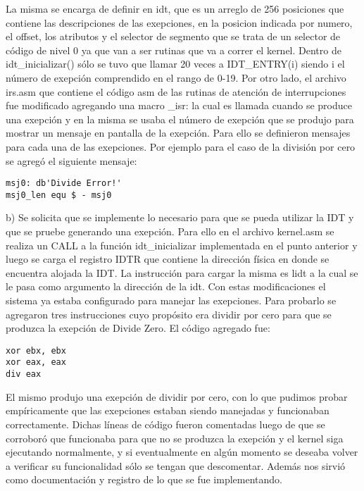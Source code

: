 \documentclass[a4paper]{article}
\begin{document}
La misma se encarga de definir en idt, que es un arreglo de 256 posiciones que contiene las descripciones de las exepciones, en la posicion indicada por numero, el offset, los atributos y el selector de segmento que se trata de un selector de código de nivel 0 ya que van a ser rutinas que va a correr el kernel. Dentro de idt_inicializar() sólo se tuvo que llamar 20 veces a IDT_ENTRY(i) siendo i el número de exepción comprendido en el rango de 0-19.
Por otro lado, el archivo irs.asm que contiene el código asm de las rutinas de atención de interrupciones fue modificado agregando una macro _isr: la cual es llamada cuando se produce una exepción y en la misma se usaba el número de exepción que se produjo para mostrar un mensaje en pantalla de la exepción. Para ello se definieron mensajes para cada una de las exepciones. Por ejemplo para el caso de la división por cero se agregó el siguiente mensaje:

\begin{verbatim}
msj0: db'Divide Error!'
msj0_len equ $ - msj0
\end{verbatim}

b) Se solicita que se implemente lo necesario para que se pueda utilizar la IDT y que se pruebe generando una exepción. Para ello en el archivo kernel.asm se realiza un CALL a la función idt_inicializar implementada en el punto anterior y luego se carga el registro IDTR que contiene la dirección física en donde se encuentra alojada la IDT. La instrucción para cargar la misma es lidt a la cual se le pasa como argumento la dirección de la idt. Con estas modificaciones el sistema ya estaba configurado para manejar las exepciones. Para probarlo se agregaron tres instrucciones cuyo propósito era dividir por cero para que se produzca la exepción de Divide Zero. El código agregado fue:

\begin{verbatim}
xor ebx, ebx
xor eax, eax
div eax
\end{verbatim}

El mismo produjo una exepción de dividir por cero, con lo que pudimos probar empíricamente que las exepciones estaban siendo manejadas y funcionaban correctamente. Dichas líneas de código fueron comentadas luego de que se corroboró que funcionaba para que no se produzca la exepción y el kernel siga ejecutando normalmente, y si eventualmente en algún momento se deseaba volver a verificar su funcionalidad sólo se tengan que descomentar. Además nos sirvió como documentación y registro de lo que se fue implementando.
\end{document}
